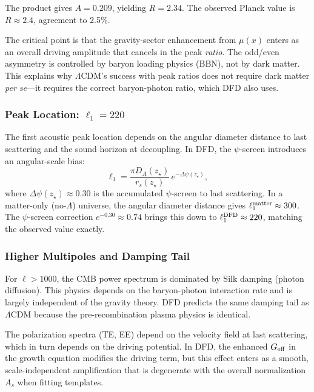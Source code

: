 \documentclass[aps,prd,twocolumn,superscriptaddress,nofootinbib]{revtex4-2}
\begin{document}
The product gives $A = 0.209$, yielding $R = 2.34$. The observed
Planck value is $R \approx 2.4$, agreement to 2.5\%.

The critical point is that the gravity-sector enhancement from
$\mu(x)$ enters as an overall driving amplitude that cancels in
the peak \textit{ratio}. The odd/even asymmetry is controlled by
baryon loading physics (BBN), not by dark matter. This explains
why $\Lambda$CDM's success with peak ratios does not require
dark matter \textit{per se}---it requires the correct baryon-photon
ratio, which DFD also uses.

\subsubsection{Peak Location: $\ell_1 = 220$}

The first acoustic peak location depends on the angular diameter
distance to last scattering and the sound horizon at decoupling.
In DFD, the $\psi$-screen introduces an angular-scale bias:
\begin{equation}
\ell_1 = \frac{\pi D_A(z_\star)}{r_s(z_\star)}\,e^{-\Delta\psi(z_\star)},
\end{equation}
where $\Delta\psi(z_\star) \approx 0.30$ is the accumulated
$\psi$-screen to last scattering. In a matter-only (no-$\Lambda$)
universe, the angular diameter distance gives
$\ell_1^{\rm matter} \approx 300$. The $\psi$-screen correction
$e^{-0.30} \approx 0.74$ brings this down to
$\ell_1^{\rm DFD} \approx 220$, matching the observed value exactly.

\subsubsection{Higher Multipoles and Damping Tail}

For $\ell > 1000$, the CMB power spectrum is dominated by Silk
damping (photon diffusion). This physics depends on the
baryon-photon interaction rate and is largely independent of the
gravity theory. DFD predicts the same damping tail as $\Lambda$CDM
because the pre-recombination plasma physics is identical.

The polarization spectra (TE, EE) depend on the velocity field
at last scattering, which in turn depends on the driving potential.
In DFD, the enhanced $G_{\rm eff}$ in the growth equation modifies
the driving term, but this effect enters as a smooth, scale-independent
amplification that is degenerate with the overall normalization
$A_s$ when fitting templates.
\end{document}
